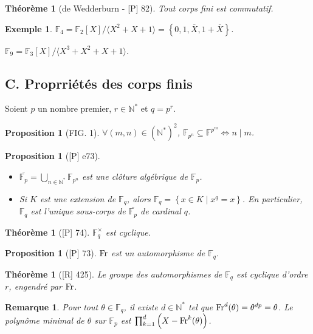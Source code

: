 \documentclass[10pt, a4paper, parskip=full, twoside, twocolumn]{report}
\newtheorem{theorem}[definition]{Théorème}
\newtheorem{proposition}[definition]{Proposition}
\newtheorem{example}[definition]{Exemple}
\newtheorem{remark}[definition]{Remarque}
\newcommand{\IN}{\mathbb{N}}
\newcommand{\IF}{\mathbb{F}}
\begin{document}
\begin{theorem}[de Wedderburn - \textnormal{[P] 82}]
	Tout corps fini est commutatif.
\end{theorem}

\begin{example}
	$\IF_4 = \IF_2[X] / \langle X^2+X+1\rangle = \left\{0, 1, \overline{X}, 1 + \overline{X}\right\}$.

	$\IF_9 = \IF_3[X] / \langle X^3 + X^2 + X +1\rangle$.
\end{example}

\subsection*{C. Proprriétés des corps finis}

\textcolor{paragraphtext}{Soient $p$ un nombre premier, $r\in \IN^*$ et $q=p^r$.}

\begin{proposition}[\textcolor{myred}{FIG. 1}]
	$\forall (m,n)\in\left(\IN^*\right)^2$, $\IF_{p^n}\subseteq \IF^{p^m} \iff n\mid m$.
\end{proposition}

\begin{proposition}[\textnormal{[P] e73}]
	\begin{itemize}
		\item $\overline{\IF_p} = \bigcup_{n\in\IN^*}\IF_{p^n}$ est une clôture algébrique de $\IF_p$.
		\item Si $K$ est une extension de $\IF_q$, alors $\IF_q=\left\{x\in K \mid x^q = x\right\}$. En particulier, $\IF_q$ est l'unique sous-corps de $\overline{\IF_p}$ de cardinal $q$.
	\end{itemize}
\end{proposition}

\begin{theorem}[\textnormal{[P] 74}]
	$\IF_q^{\times}$ est cyclique.
\end{theorem}

\begin{proposition}[\textnormal{[P] 73}]
	$\textnormal{Fr}$ est un automorphisme de $\IF_q$.
\end{proposition}

\begin{theorem}[\textnormal{[R] 425}]
	Le groupe des automorphismes de $\IF_q$ est cyclique d'ordre $r$, engendré par $\textnormal{Fr}$.
\end{theorem}

\begin{remark}
	Pour tout $\theta\in\IF_q$, il existe $d\in\IN^*$ tel que $\textnormal{Fr}^d(\theta) = \theta^{dp} = \theta$.
	Le polynôme minimal de $\theta$ sur $\IF_p$ est $\prod_{k=1}^{d}\left(X-\textnormal{Fr}^k(\theta)\right)$.
\end{remark}
\end{document}
